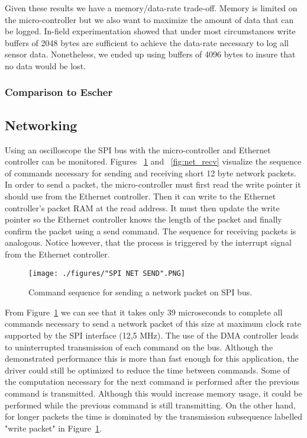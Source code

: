 Given these results we have a memory/data-rate trade-off. Memory is limited on the micro-controller but we also want to maximize the amount of data that can be logged. In-field experimentation showed that under most circumstances write buffers of 2048 bytes are sufficient to achieve the data-rate necessary to log all sensor data. Nonetheless, we ended up using buffers of 4096 bytes to insure that no data would be lost.

\subsubsection{Comparison to Escher}


\subsection{Networking}

Using an oscilloscope the SPI bus with the micro-controller and Ethernet controller can be monitored. Figures ~\ref{fig:net_send} and ~\ref{fig:net_recv} visualize the sequence of commands necessary for sending and receiving short 12 byte network packets. In order to send a packet, the micro-controller must first read the write pointer it should use from the Ethernet controller. Then it can write to the Ethernet controller's packet RAM at the read address. It must then update the write pointer so the Ethernet controller knows the length of the packet and finally confirm the packet using a send command. The sequence for receiving packets is analogous. Notice however, that the process is triggered by the interrupt signal from the Ethernet controller.

\begin{figure}[H]
    \centering \texttt{[image: ./figures/"SPI NET SEND".PNG]}
    \caption{Command sequence for sending a network packet on SPI bus.}
    \label{fig:net_send}
\end{figure}

From Figure~\ref{fig:net_send} we can see that it takes only 39 microseconds to complete all commands necessary to send a network packet of this size at maximum clock rate supported by the SPI interface (12,5 MHz). The use of the DMA controller leads to uninterrupted transmission of each command on the bus. Although the demonstrated performance this is more than fast enough for this application, the driver could still be optimized to reduce the time between commands. Some of the computation necessary for the next command is performed after the previous command is transmitted. Although this would increase memory usage, it could be performed while the previous command is still transmitting. On the other hand, for longer packets the time is dominated by the transmission subsequence labelled "write packet" in Figure~\ref{fig:net_send}.

